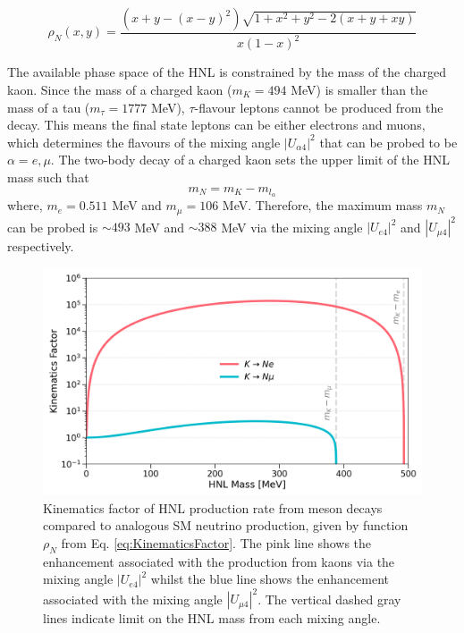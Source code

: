 \begin{equation}
	\rho_{N}(x,y) = \frac{(x+y-(x-y)^{2})\sqrt{1+x^{2}+y^{2}-2(x+y+xy)}}{x(1-x)^{2}}
\label{eq:KinematicsFactor}
\end{equation}


The available phase space of the HNL is constrained by the mass of the charged kaon.
Since the mass of a charged kaon ($m_{K} = 494 $ MeV) is smaller than the mass of a tau ($m_{\tau}=1777 $ MeV), $\tau$-flavour leptons cannot be produced from the decay.  
This means the final state leptons can be either electrons and muons, which determines the flavours of the mixing angle $|U_{\alpha4}|^{2}$ that can be probed to be $\alpha = e, \mu$.
The two-body decay of a charged kaon sets the upper limit of the HNL mass such that
\begin{equation}
	m_{N} = m_{K} - m_{l_{\alpha}}
\end{equation}
where, $m_{e}= 0.511 $ MeV and $m_{\mu}= 106 $ MeV.
Therefore, the maximum mass $m_{N}$ can be probed is $\sim493$ MeV  and $\sim388$ MeV via the mixing angle $|U_{e4}|^{2}$ and $|U_{\mu4}|^{2}$ respectively.

\begin{figure}[t] 
\centering    
\includegraphics[width=1.0\textwidth]{kinematics_factor}
\caption[KinematicsFactor]{
Kinematics factor of HNL production rate from meson decays compared to analogous SM neutrino production, given by function $\rho_{N}$ from Eq. \ref{eq:KinematicsFactor}.
The pink line shows the enhancement associated with the production from kaons via the mixing angle $|U_{e4}|^{2}$ whilst the blue line shows the enhancement associated with the mixing angle $|U_{\mu4}|^{2}$.
The vertical dashed gray lines indicate limit on the HNL mass from each mixing angle. 
}
\label{fig:KinematicsFactor}
\end{figure}

